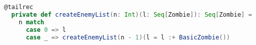 \begin{lstlisting}[language=Scala, label=code:tailrec-basiczombie, caption=Tail recursive Function per la creazione di Wave con Scala.]
  @tailrec
  private def createEnemyList(n: Int)(l: Seq[Zombie]): Seq[Zombie] =
    n match
      case 0 => l
      case _ => createEnemyList(n - 1)(l = l :+ BasicZombie())
\end{lstlisting}